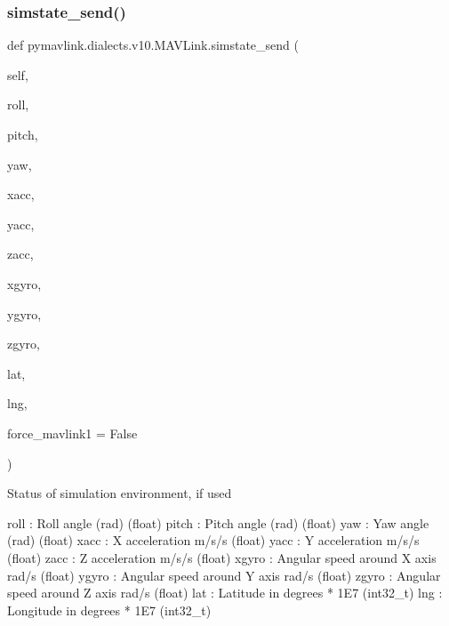 \begin{DoxyVerb}
\begin{DoxyVerb}
\begin{DoxyVerb}
\begin{DoxyVerb}
\begin{DoxyVerb}
\begin{DoxyVerb}
\begin{DoxyVerb}
\begin{DoxyVerb}
\begin{DoxyVerb}
\begin{DoxyVerb}
\subsubsection{\texorpdfstring{simstate\+\_\+send()}{simstate\_send()}}
{\footnotesize\ttfamily def pymavlink.\+dialects.\+v10.\+M\+A\+V\+Link.\+simstate\+\_\+send (\begin{DoxyParamCaption}\item[{}]{self,  }\item[{}]{roll,  }\item[{}]{pitch,  }\item[{}]{yaw,  }\item[{}]{xacc,  }\item[{}]{yacc,  }\item[{}]{zacc,  }\item[{}]{xgyro,  }\item[{}]{ygyro,  }\item[{}]{zgyro,  }\item[{}]{lat,  }\item[{}]{lng,  }\item[{}]{force\+\_\+mavlink1 = {\ttfamily False} }\end{DoxyParamCaption})}

\begin{DoxyVerb}Status of simulation environment, if used

roll                      : Roll angle (rad) (float)
pitch                     : Pitch angle (rad) (float)
yaw                       : Yaw angle (rad) (float)
xacc                      : X acceleration m/s/s (float)
yacc                      : Y acceleration m/s/s (float)
zacc                      : Z acceleration m/s/s (float)
xgyro                     : Angular speed around X axis rad/s (float)
ygyro                     : Angular speed around Y axis rad/s (float)
zgyro                     : Angular speed around Z axis rad/s (float)
lat                       : Latitude in degrees * 1E7 (int32_t)
lng                       : Longitude in degrees * 1E7 (int32_t)\end{DoxyVerb}
 \mbox{\label{classpymavlink_1_1dialects_1_1v10_1_1MAVLink_abd31da74dc9d7e840ea09b36ab321a88}} 

\end{DoxyVerb}
\end{DoxyVerb}
\end{DoxyVerb}
\end{DoxyVerb}
\end{DoxyVerb}
\end{DoxyVerb}
\end{DoxyVerb}
\end{DoxyVerb}
\end{DoxyVerb}
\end{DoxyVerb}
